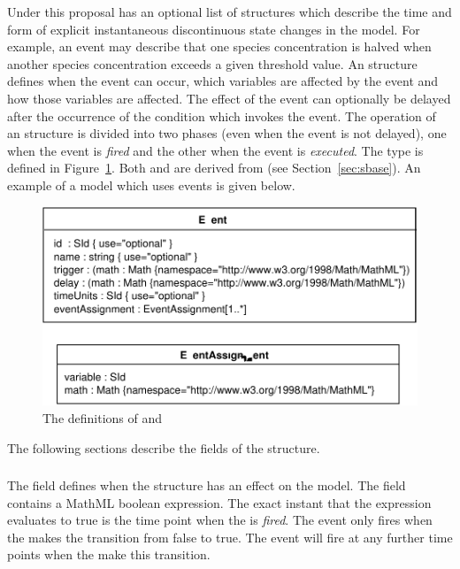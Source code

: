 \documentclass[10pt]{cekarticle}
\newcommand{\vref}[1]{\ref{#1}}
\begin{document}
Under this proposal  has an optional list of  structures which describe the time and form of explicit instantaneous discontinuous state changes in the model.  For example, an event may describe that one species concentration is halved when another species concentration exceeds a given threshold value.  An  structure defines when the event can occur, which variables are affected by the event and how those variables are affected. The effect of the event can optionally be delayed after the occurrence of the condition which invokes the event. The operation of an  structure is divided into two phases (even when the event is not delayed), one when the event is \emph{fired} and the other when the event is \emph{executed}. The  type is defined in Figure~\vref{fig:event}.  Both  and  are derived from  (see Section~\ref{sec:sbase}).  An example of a model which uses events is given below.

\begin{figure}[htb]
  \centering
  \includegraphics[scale = 0.68]{event}
  \caption{The definitions of  and }
  \label{fig:event}
\end{figure}

The following sections describe the fields of the 
structure.

\subsubsection{}
The  field defines when the 
structure has an effect on the model.  The  field
contains a MathML boolean expression.  The exact instant that the
expression evaluates to true is the time point when the
 is \emph{fired}.  The event only fires when the
 makes the transition from false to true.  The
event will fire at any further time points when the
 make this transition.
\end{document}
